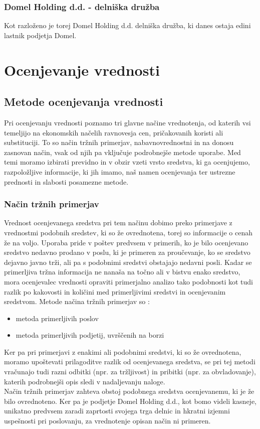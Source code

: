\documentclass[12pt,a4paper]{amsart}
\theoremstyle{definition} %
\theoremstyle{plain} %
\begin{document}
\subsubsection{Domel Holding d.d. - delniška družba}
Kot razloženo je torej Domel Holding d.d. delniška družba, ki danes ostaja edini lastnik podjetja Domel. 




\section{Ocenjevanje vrednosti}
\subsection{Metode ocenjevanja vrednosti}
Pri ocenjevanju vrednosti poznamo tri glavne načine vrednotenja, od katerih vsi temeljijo na ekonomskih načelih ravnovesja cen, pričakovanih koristi ali substituciji. To so način tržnih primerjav, nabavnovrednostni in na donosu zasnovan način, vsak od njih pa vključuje podrobnejše metode uporabe. Med temi moramo izbirati previdno in v obzir vzeti vrsto sredstva, ki ga ocenjujemo, razpoložljive informacije, ki jih imamo, naš namen ocenjevanja ter ustrezne prednosti in slabosti posamezne metode. 

\subsubsection{Način tržnih primerjav}
Vrednost ocenjevanega sredstva pri tem načinu dobimo preko primerjave z vrednostmi podobnih sredstev, ki so že ovrednotena, torej so informacije o cenah že na voljo. Uporaba pride v poštev predvsem v primerih, ko je bilo ocenjevano sredstvo nedavno prodano v poslu, ki je primeren za proučevanje, ko se sredstvo dejavno javno trži, ali pa s podobnimi sredstvi obstajajo nedavni posli. Kadar se primerljiva tržna informacija ne nanaša na točno ali v bistvu enako sredstvo, mora ocenjevalec vrednosti opraviti primerjalno analizo tako podobnosti kot tudi razlik po kakovosti in količini med primerljivimi sredstvi in ocenjevanim sredstvom. 
Metode načina tržnih primerjav so :
\begin{itemize}
\item metoda primerljivih poslov
\item metoda primerljivih podjetij, uvrščenih na borzi
\end{itemize}
Ker pa pri primerjavi z enakimi ali podobnimi sredstvi, ki so že ovrednotena, moramo upoštevati prilagoditve razlik od ocenjevanega sredstva, se pri tej metodi vračunajo tudi razni odbitki (npr. za tržljivost) in pribitki (npr. za obvladovanje), katerih podrobnejši opis sledi v nadaljevanju naloge.\\
Način tržnih primerjav zahteva obstoj podobnega sredstva ocenjevanemu, ki je že bilo ovrednoteno. Ker pa je podjetje Domel Holding d.d., kot bomo videli kasneje, unikatno predvsem zaradi zaprtosti svojega trga delnic in hkratni izjemni uspešnosti pri poslovanju, za vrednotenje opisan način ni primeren. 
\end{document}
